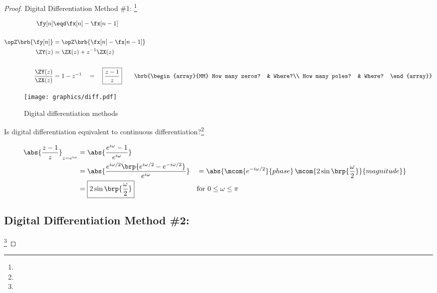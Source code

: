 \begin{proof}
Digital Differentiation Method \#1: \footnote{}
 
\begin{align*}
  \fy[n]
    &\eqd \fx[n] - \fx[n-1]
  \\\\
  \opZ\brb{\fy[n]} &= \opZ\brb{\fx[n] - \fx[n-1]}
  \\
  \ZY(z) &= \ZX(z) + z^{-1}\ZX(z)
  \\\\
  \frac{\ZY(z)}{\ZX(z)} &= 1-z^{-1} \quad=\quad \boxed{\frac{z-1}{z}}
  \qquad\brb{\begin{array}{MM}
    How many zeros? & Where?\\
    How many poles? & Where?
  \end{array}}
\end{align*}

 
\begin{figure}[h]
  \centering
  \texttt{[image: graphics/diff.pdf]}
  \caption{Digital differentiation methods\label{fig:differentiation}}
\end{figure}
Is digital differentiation equivalent to continuous differentiation?\footnote{}
 
\begin{align*}
  \abs{\frac{z-1}{z}}_{z=e^{i\omega}}
    &= \abs{\frac{e^{i\omega}-1}
                 {e^{i\omega}}
           }
  \\&= \abs{\frac{e^{i\omega/2}\brp{e^{i\omega/2}-e^{-i\omega/2}}}
                 {e^{i\omega}}
           }
   &&= \abs{\mcom{e^{-i\omega/2}}{phase}\,\mcom{{2\sin\brp{\frac{\omega}{2}}}}{magnitude}}
  \\&= \boxed{{2\sin\brp{\frac{\omega}{2}}}} 
    && \text{for $0\le\omega\le\pi$}
\end{align*}

\subsection{Digital Differentiation Method \#2: }
\footnote{}
 

\end{proof}
